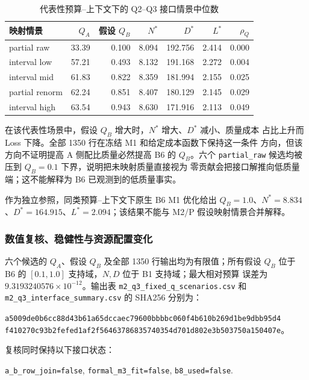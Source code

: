 \begin{table}[htbp]
  \centering
  \caption{代表性预算--上下文下的 Q2--Q3 接口情景中位数}
  \label{tab:q3-sp3-representative}
  \small
  \begin{tabular}{lrrrrrr}
    \toprule
    映射情景 & $Q_A$ & 假设 $Q_B$ & $N^*$ & $D^*$ & $L^*$ & $\rho_Q$\\
    \midrule
    partial raw & 33.39 & 0.100 & 8.094 & 192.756 & 2.414 & 0.000\\
    interval low & 57.21 & 0.493 & 8.132 & 191.168 & 2.272 & 0.004\\
    interval mid & 61.83 & 0.822 & 8.359 & 181.994 & 2.155 & 0.025\\
    partial renorm & 62.24 & 0.851 & 8.407 & 180.129 & 2.145 & 0.029\\
    interval high & 63.54 & 0.943 & 8.630 & 171.916 & 2.113 & 0.049\\
    \bottomrule
  \end{tabular}
\end{table}

在该代表性场景中，假设 $Q_B$ 增大时，$N^*$ 增大、$D^*$ 减小、质量成本
占比上升而 Loss 下降。全部 1350 行在冻结 M1 和给定成本函数下保持这一条件
方向，但该方向不证明提高 A 侧配比质量必然提高 B6 的 $Q_B$。六个
\texttt{partial\_raw} 候选均被压到 $Q_B=0.1$ 下界，说明把未映射质量直接视为
零贡献会把接口解推向低质量端；这不能解释为 B6 已观测到的低质量事实。

作为独立参照，同类预算--上下文下原生 B6 M1 优化给出
$Q_B=1.0$、$N^*=8.834$、$D^*=164.915$、$L^*=2.094$；该结果不能与
M2/P 假设映射情景合并解释。

\subsubsection{数值复核、稳健性与资源配置变化}

六个候选的 $Q_A$、假设 $Q_B$ 及全部 1350 行输出均为有限值；所有假设
$Q_B$ 位于 B6 的 $[0.1,1.0]$ 支持域，$N,D$ 位于 B1 支持域；最大相对预算
误差为 $9.3193240576\times10^{-12}$。输出表
\texttt{m2\_q3\_fixed\_q\_scenarios.csv} 和
\texttt{m2\_q3\_interface\_summary.csv} 的 SHA256 分别为：
\begin{center}
{\scriptsize\texttt{a5009de0b6cc88d43b61a65dccaec79600bbbbc060f4b610b269d1be9dbb95d4}}\\
{\scriptsize\texttt{f410270c93b2fefed1af2f56463786835740354d701d802e3b503750a150407e}}。
\end{center}
复核同时保持以下接口状态：
\begin{center}
\texttt{a\_b\_row\_join=false},\quad
\texttt{formal\_m3\_fit=false},\quad
\texttt{b8\_used=false}.
\end{center}

